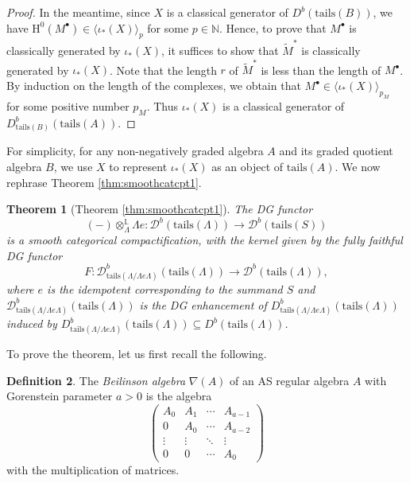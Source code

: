 \documentclass[11pt,reqno]{amsart}
\newtheorem{theorem}{Theorem}[section]
\theoremstyle{definition}
\newtheorem{definition}[theorem]{Definition}
\begin{document}
\begin{proof}
 In the meantime, since
 $X$ is a classical generator of
 $D^{b}(\mathrm{tails}(B))$, 
 we have 
 $ \mathrm{H}^{0}(M^{\bullet}) \in 
\langle \iota_{\ast}(X)\rangle_{p}$ for some $p \in \mathbb{N}$. 
Hence,
to prove that $M^{\bullet}$ is classically generated by 
$\iota_{\ast}(X)$, it 
suffices to show that $\widetilde{M}^{\ast}$ is classically generated 
by $\iota_{\ast}(X)$.  
Note that 
the length $r$ of 
$\widetilde{M}^{\ast}$ is less 
than the length of $M^{\bullet}$. 
By induction on the length of 
the complexes, we obtain that $M^{\bullet} \in \langle \iota_{\ast}(X) 
\rangle_{p_M}$ 
for some positive number $p_M$. Thus 
$\iota_{\ast}(X)$ is a classical generator of $D_{\mathrm{tails}(B)}^{b}(\mathrm{tails}(A))$.
\end{proof}

For simplicity, for any non-negatively graded algebra $A$ and 
its graded quotient algebra $B$, we use $X$ to represent 
$\iota_{\ast}(X)$ 
as an object of 
$\mathrm{tails}(A)$. 
We now rephrase 
Theorem \ref{thm:smoothcatcpt1}.


\begin{theorem}[Theorem \ref{thm:smoothcatcpt1}]\label{thm:smoothcatcpt1equiv}
The DG functor
$$
 (-) \otimes^{\mathbb{L}}_{\Lambda} \Lambda e : \mathcal{D}^{b}(\mathrm{tails}(\Lambda)) 
\rightarrow \mathcal{D}^{b}(\mathrm{tails}(S))
$$
is a smooth categorical compactification, 
with the kernel given by the fully faithful DG functor
$$
F: \mathcal{D}^{b}_{\mathrm{tails}(\Lambda/\Lambda e \Lambda)}(\mathrm{tails}(\Lambda)) 
\rightarrow \mathcal{D}^{b}(\mathrm{tails}(\Lambda)),
$$
where $e$ is the idempotent corresponding to the summand $S$ and 
$\mathcal{D}^{b}_{\mathrm{tails}(\Lambda/\Lambda e \Lambda)}(\mathrm{tails}(\Lambda))$ is the 
DG enhancement of $D^{b}_{\mathrm{tails}(\Lambda/\Lambda e \Lambda)}(\mathrm{tails}
(\Lambda))$ induced by $D^{b}_{\mathrm{tails}(\Lambda/\Lambda e \Lambda)}(\mathrm{tails}
(\Lambda)) \subseteq D^{b}(\mathrm{tails}(\Lambda))$.
\end{theorem}

To prove the theorem, let us first recall the following.

\begin{definition}
The {\it Beilinson algebra} $\nabla(A)$ of an AS regular algebra $A$ with Gorenstein parameter $a > 0$
is the algebra
$$
\begin{pmatrix}
A_0 & A_1 & \cdots & A_{a-1}  \\
0 & A_0 & \cdots & A_{a-2} \\
\vdots & \vdots & \ddots & \vdots \\
0 & 0 & \cdots & A_0
\end{pmatrix}
$$
with the multiplication of matrices. 
\end{definition}
\end{document}
